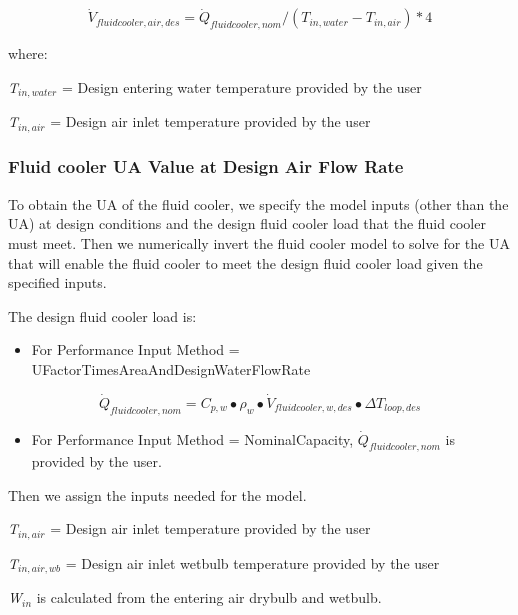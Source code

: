 \begin{equation}
{\dot V_{fluidcooler,air,des}} = {\dot Q_{fluidcooler,nom}}/({T_{in,water}} - {T_{in,air}})*4
\end{equation}

where:

\emph{T\(_{in,water}\)} = Design entering water temperature provided by the user

\emph{T\(_{in,air}\)} = Design air inlet temperature provided by the user

\subsubsection{Fluid cooler UA Value at Design Air Flow Rate}\label{fluid-cooler-ua-value-at-design-air-flow-rate}

To obtain the UA of the fluid cooler, we specify the model inputs (other than the UA) at design conditions and the design fluid cooler load that the fluid cooler must meet. Then we numerically invert the fluid cooler model to solve for the UA that will enable the fluid cooler to meet the design fluid cooler load given the specified inputs.

The design fluid cooler load is:

\begin{itemize}
\tightlist
\item
  For Performance Input Method = UFactorTimesAreaAndDesignWaterFlowRate
\end{itemize}

\begin{equation}
{\dot Q_{fluidcooler,nom}} = {C_{p,w}} \bullet {\rho_w} \bullet {\dot V_{fluidcooler,w,des}} \bullet \Delta {T_{loop,des}}
\end{equation}

\begin{itemize}
\tightlist
\item
  For Performance Input Method = NominalCapacity, \({\dot Q_{fluidcooler,nom}}\) is provided by the user.
\end{itemize}

Then we assign the inputs needed for the model.

\emph{T\(_{in,air}\)} = Design air inlet temperature provided by the user

\emph{T\(_{in,air,wb}\)} = Design air inlet wetbulb temperature provided by the user

\emph{W\(_{in}\)} is calculated from the entering air drybulb and wetbulb.

